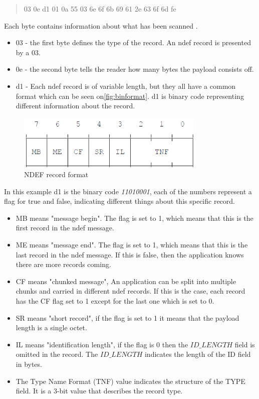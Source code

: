 \begin{quote}
03 0e d1 01 0a 55 03 6e 6f 6b 69 61 2e 63 6f 6d fe
\end{quote}

Each byte contains information about what has been scanned \citep{ndef}.

\begin{itemize}
\item 03 - the first byte defines the type of the record. An \ac{ndef} record is presented by a 03.
\item 0e - the second byte tells the reader how many bytes the payload consists off.
\item d1 - Each \ac{ndef} record is of variable length, but they all have a common format which can be seen on\autoref{fig:binformat}. d1 is binary code representing different information about the record.
\end{itemize}

\begin{figure}[H]
\centering
\includegraphics[width=0.8\textwidth]{img/binformat.png}
\caption{NDEF record format\citep{ndef}}
\label{fig:binformat}
\end{figure}

In this example d1 is the binary code \textit{11010001}, each of the numbers represent a flag for true and false, indicating different things about this specific record\citep{ndef}. 

\begin{itemize}
\item MB means "message begin". The flag is set to 1, which means that this is the first record in the \ac{ndef} message.
\item ME means "message end". The flag is set to 1, which means that this is the last record in the \ac{ndef} message. If this is false, then the application knows there are more records coming.
\item CF means "chunked message", An application can be split into multiple chunks and carried in different \ac{ndef} records. If this is the case, each record has the CF flag set to 1 except for the last one which is set to 0.
\item SR means "short record", if the flag is set to 1 it means that the payload length is a single octet. 
\item IL means "identification length", if the flag is 0 then the $ID\_LENGTH$ field is omitted in the record. The $ID\_LENGTH$ indicates the length of the ID field in bytes\citep{ndefformat}.
\item The Type Name Format (TNF) value indicates the structure of the TYPE field. It is a 3-bit value that describes the record type\citep{ndefformat}.
\end{itemize}

